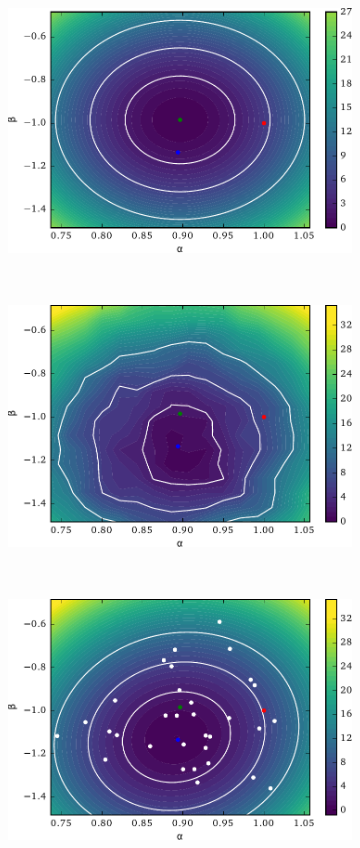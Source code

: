 \documentclass[12pt]{article}
\numberwithin{equation}{section}
\theoremstyle{plain}
\begin{document}
\begin{figure}
    \centering
    \begin{subfigure}[t]{0.31\textwidth}
        \includegraphics[width=\textwidth]{figures/fig5a.pdf}
        \caption{  }
        \label{fig:5a}
    \end{subfigure}
    ~
    \begin{subfigure}[t]{0.31\textwidth}
        \includegraphics[width=\textwidth]{figures/fig5b.pdf}
        \caption{ }
        \label{fig:5b}
    \end{subfigure}
    ~
    \begin{subfigure}[t]{0.31\textwidth}
        \includegraphics[width=\textwidth]{figures/fig5c.pdf}

\end{subfigure}
\end{figure}
\end{document}
